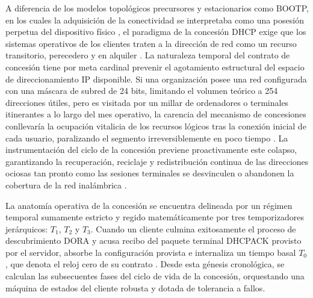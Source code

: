 \documentclass[a4paper,12pt]{article}
\begin{document}
A diferencia de los modelos topológicos precursores y estacionarios como BOOTP, en los cuales la adquisición de la conectividad se interpretaba como una posesión perpetua del dispositivo físico \cite{geeksforgeeks_bootp_dhcp, lightyear_bootp_dhcp}, el paradigma de la concesión DHCP exige que los sistemas operativos de los clientes traten a la dirección de red como un recurso transitorio, perecedero y en alquiler \cite{rfc2131, godaddy_dhcp}. La naturaleza temporal del contrato de concesión tiene por meta cardinal prevenir el agotamiento estructural del espacio de direccionamiento IP disponible. Si una organización posee una red configurada con una máscara de subred de 24 bits, limitando el volumen teórico a 254 direcciones útiles, pero es visitada por un millar de ordenadores o terminales itinerantes a lo largo del mes operativo, la carencia del mecanismo de concesiones conllevaría la ocupación vitalicia de los recursos lógicos tras la conexión inicial de cada usuario, paralizando el segmento irreversiblemente en poco tiempo \cite{manageengine_dhcp_lease}. La instrumentación del ciclo de la concesión previene proactivamente este colapso, garantizando la recuperación, reciclaje y redistribución continua de las direcciones ociosas tan pronto como las sesiones terminales se desvinculen o abandonen la cobertura de la red inalámbrica \cite{manageengine_dhcp_lease, serviciosgs_dhcp}.

La anatomía operativa de la concesión se encuentra delineada por un régimen temporal sumamente estricto y regido matemáticamente por tres temporizadores jerárquicos: $T_1$, $T_2$ y $T_3$. Cuando un cliente culmina exitosamente el proceso de descubrimiento DORA y acusa recibo del paquete terminal DHCPACK provisto por el servidor, absorbe la configuración provista e internaliza un tiempo basal $T_0$, que denota el reloj cero de su contrato \cite{serviciosgs_dhcp}. Desde esta génesis cronológica, se calculan las subsecuentes fases del ciclo de vida de la concesión, orquestando una máquina de estados del cliente robusta y dotada de tolerancia a fallos.
\end{document}

